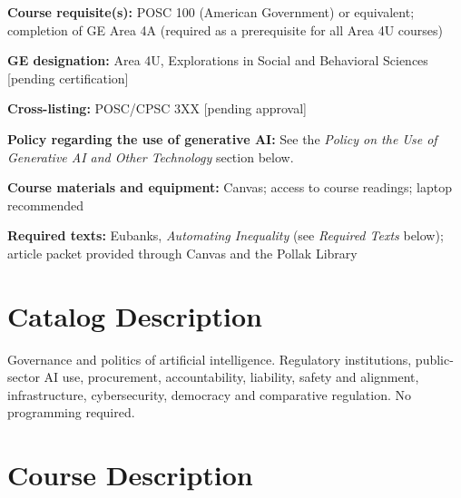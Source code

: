 \documentclass[12pt]{article}
\begin{document}
\vspace{0.5em}
\begin{flatlist}
\item \textbf{Course requisite(s):} POSC 100 (American Government) or equivalent; completion of GE Area 4A (required as a prerequisite for all Area 4U courses)
\item \textbf{GE designation:} Area 4U, Explorations in Social and Behavioral Sciences [pending certification]
\item \textbf{Cross-listing:} POSC/CPSC 3XX [pending approval]
\item \textbf{Policy regarding the use of generative AI:} See the \emph{Policy on the Use of Generative AI and Other Technology} section below.
\item \textbf{Course materials and equipment:} Canvas; access to course readings; laptop recommended
\item \textbf{Required texts:} Eubanks, \emph{Automating Inequality} (see \emph{Required Texts} below); article packet provided through Canvas and the Pollak Library
\end{flatlist}

\section*{Catalog Description}
Governance and politics of artificial intelligence. Regulatory institutions, public-sector AI use, procurement, accountability, liability, safety and alignment, infrastructure, cybersecurity, democracy and comparative regulation. No programming required.

\section*{Course Description}
\end{document}
